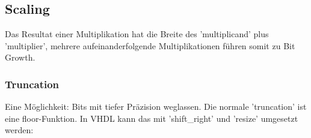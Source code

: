 \subsection{Scaling}$~$ \\
Das Resultat einer Multiplikation hat die Breite des 'multiplicand' plus 'multiplier', mehrere aufeinanderfolgende Multiplikationen führen somit zu Bit Growth.

\subsubsection{Truncation}$~$ \\
Eine Möglichkeit: Bits mit tiefer Präzision weglassen. Die normale 'truncation' ist eine floor-Funktion. In VHDL kann das mit 'shift\_right' und 'resize' umgesetzt werden:

